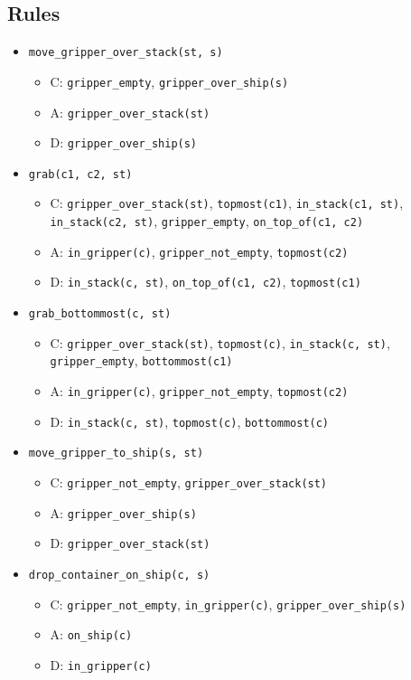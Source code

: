 \documentclass[12pt]{article}
\begin{document}
\subsection{Rules}
\begin{itemize}
  \item \texttt{move\_gripper\_over\_stack(st, s)}
    \begin{itemize}
      \item C: \texttt{gripper\_empty}, \texttt{gripper\_over\_ship(s)}
      \item A: \texttt{gripper\_over\_stack(st)}
      \item D: \texttt{gripper\_over\_ship(s)}
    \end{itemize}
  \item \texttt{grab(c1, c2, st)}
    \begin{itemize}
      \item C: \texttt{gripper\_over\_stack(st)}, \texttt{topmost(c1)}, \texttt{in\_stack(c1, st)}, \texttt{in\_stack(c2, st)}, \texttt{gripper\_empty}, \texttt{on\_top\_of(c1, c2)}
      \item A: \texttt{in\_gripper(c)}, \texttt{gripper\_not\_empty}, \texttt{topmost(c2)}
      \item D: \texttt{in\_stack(c, st)}, \texttt{on\_top\_of(c1, c2)}, \texttt{topmost(c1)}
    \end{itemize}
  \item \texttt{grab\_bottommost(c, st)}
    \begin{itemize}
      \item C: \texttt{gripper\_over\_stack(st)}, \texttt{topmost(c)}, \texttt{in\_stack(c, st)}, \texttt{gripper\_empty}, \texttt{bottommost(c1)}
      \item A: \texttt{in\_gripper(c)}, \texttt{gripper\_not\_empty}, \texttt{topmost(c2)}
      \item D: \texttt{in\_stack(c, st)}, \texttt{topmost(c)}, \texttt{bottommost(c)}
    \end{itemize}
  \item \texttt{move\_gripper\_to\_ship(s, st)}
    \begin{itemize}
      \item C: \texttt{gripper\_not\_empty}, \texttt{gripper\_over\_stack(st)}
      \item A: \texttt{gripper\_over\_ship(s)}
      \item D: \texttt{gripper\_over\_stack(st)}
    \end{itemize}
  \item \texttt{drop\_container\_on\_ship(c, s)}
    \begin{itemize}
      \item C: \texttt{gripper\_not\_empty}, \texttt{in\_gripper(c)}, \texttt{gripper\_over\_ship(s)}
      \item A: \texttt{on\_ship(c)}
      \item D: \texttt{in\_gripper(c)}
    \end{itemize}
\end{itemize}
\end{document}
